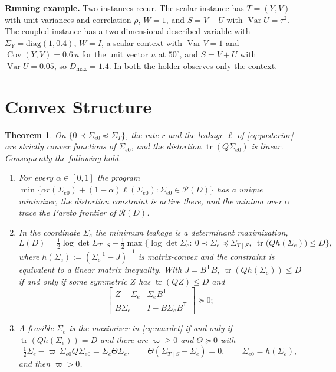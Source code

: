 \documentclass[11pt,onecolumn]{IEEEtran}
\newtheorem{theorem}{Theorem}
\newcommand{\tr}{\operatorname{tr}}
\newcommand{\Cov}{\operatorname{Cov}}
\newcommand{\Var}{\operatorname{Var}}
\newcommand{\RW}{\mathcal{R}}
\newcommand{\Se}{\Sigma_{e}}
\newcommand{\Sez}{\Sigma_{e0}}
\newcommand{\Kc}{\Sigma_{T\mid S}}
\begin{document}
\textbf{Running example.} Two instances recur. The scalar instance has
$T=(Y,V)$ with unit variances and correlation $\rho$, $W=1$, and
$S=V+U$ with $\Var U=\tau^2$. The coupled instance has a
two-dimensional described variable with $\Sigma_Y=\mathrm{diag}(1,0.4)$,
$W=I$, a scalar context with $\Var V=1$ and $\Cov(Y,V)=0.6\,u$ for the
unit vector $u$ at $50^\circ$, and $S=V+U$ with $\Var U=0.05$, so
$D_{\max}=1.4$. In both the holder observes only the context.

\section{Convex Structure}
\label{sec:convex}

\begin{theorem}\label{thm:convex}
On $\{0\prec\Sez\preceq\Sigma_T\}$, the rate $r$ and the leakage $\ell$
of \eqref{eq:posterior} are strictly convex functions of $\Sez$, and the
distortion $\tr(Q\Sez)$ is linear. Consequently the following hold.
\begin{enumerate}
\item[(a)] For every $\alpha\in[0,1]$ the program
$\min\{\alpha r(\Sez)+(1-\alpha)\ell(\Sez):\Sez\in\mathcal P(D)\}$ has a
unique minimizer, the distortion constraint is active there, and the
minima over $\alpha$ trace the Pareto frontier of $\RW(D)$.
\item[(b)] In the coordinate $\Se$ the minimum leakage is a determinant
maximization,
\begin{equation}
L(D)=\tfrac12\log\det\Kc-\tfrac12\max\bigl\{\log\det\Se:\
0\prec\Se\preceq\Kc,\ \tr\bigl(Qh(\Se)\bigr)\le D\bigr\},
\label{eq:maxdet}
\end{equation}
where $h(\Se):=(\Se^{-1}-J)^{-1}$ is matrix-convex and the constraint is equivalent to a
linear matrix inequality. With $J=B^{\mathsf T}B$,
$\tr(Qh(\Se))\le D$ if and only if some symmetric $Z$ has
$\tr(QZ)\le D$ and
\begin{equation}
\begin{bmatrix}
Z-\Se&\Se B^{\mathsf T}\\
B\Se&I-B\Se B^{\mathsf T}
\end{bmatrix}\succeq0 ;
\label{eq:lmi}
\end{equation}
\item[(c)] A feasible $\Se$ is the maximizer in \eqref{eq:maxdet} if and
only if $\tr(Qh(\Se))=D$ and there are $\varpi\ge0$ and $\Theta\succeq0$
with
\begin{equation}
\tfrac12\Se-\varpi\,\Sez Q\Sez=\Se\Theta\Se,
\qquad
\Theta(\Kc-\Se)=0,
\qquad \Sez=h(\Se),
\label{eq:kkt}
\end{equation}
and then $\varpi>0$.
\end{enumerate}
\end{theorem}
\end{document}
